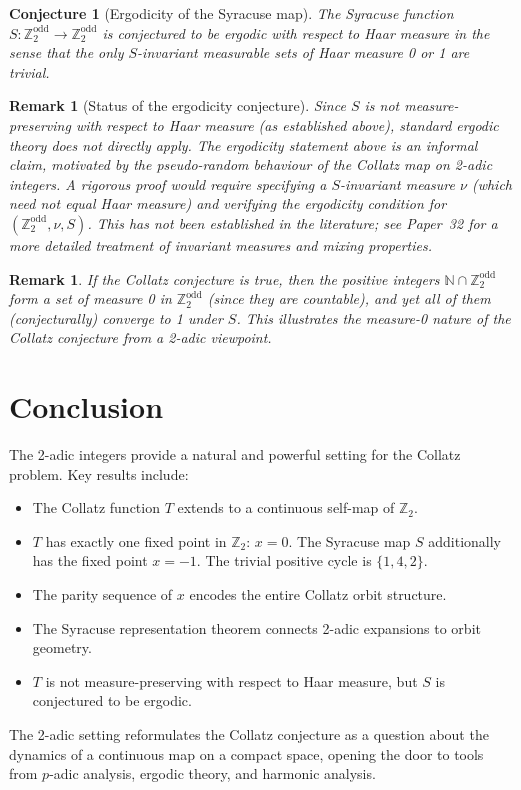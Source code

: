 \documentclass[12pt,a4paper]{article}
\newtheorem{remark}[theorem]{Remark}
\newtheorem{conjecture}[theorem]{Conjecture}
\begin{document}
\begin{conjecture}[Ergodicity of the Syracuse map]\label{conj:ergodic_S}
The Syracuse function $S\colon \mathbb{Z}_2^{\text{odd}} \to \mathbb{Z}_2^{\text{odd}}$
is conjectured to be \emph{ergodic with respect to Haar measure} in the sense that
the only $S$-invariant measurable sets of Haar measure 0 or 1 are trivial.
\end{conjecture}

\begin{remark}[Status of the ergodicity conjecture]
Since $S$ is \emph{not} measure-preserving with respect to Haar measure (as established
above), standard ergodic theory does not directly apply.  The ergodicity statement
above is an informal claim, motivated by the pseudo-random behaviour of the Collatz
map on 2-adic integers.  A rigorous proof would require specifying a $S$-invariant
measure $\nu$ (which need not equal Haar measure) and verifying the ergodicity
condition for $(\mathbb{Z}_2^{\text{odd}}, \nu, S)$.  This has not been established
in the literature; see Paper~32 for a more detailed treatment of invariant measures
and mixing properties.
\end{remark}

\begin{remark}\label{rem:conjecture_measure}
If the Collatz conjecture is true, then the positive integers $\mathbb{N} \cap \mathbb{Z}_2^{\text{odd}}$
form a set of measure 0 in $\mathbb{Z}_2^{\text{odd}}$ (since they are countable), and
yet \emph{all} of them (conjecturally) converge to 1 under $S$. This illustrates the
measure-0 nature of the Collatz conjecture from a 2-adic viewpoint.
\end{remark}

\section{Conclusion}

The 2-adic integers provide a natural and powerful setting for the Collatz problem.
Key results include:
\begin{itemize}
  \item The Collatz function $T$ extends to a continuous self-map of $\mathbb{Z}_2$.
  \item $T$ has exactly one fixed point in $\mathbb{Z}_2$: $x=0$. The Syracuse map $S$ additionally has the fixed point $x=-1$. The trivial positive cycle is $\{1, 4, 2\}$.
  \item The parity sequence of $x$ encodes the entire Collatz orbit structure.
  \item The Syracuse representation theorem connects 2-adic expansions to orbit geometry.
  \item $T$ is not measure-preserving with respect to Haar measure, but $S$ is conjectured to be ergodic.
\end{itemize}
The 2-adic setting reformulates the Collatz conjecture as a question about the dynamics
of a continuous map on a compact space, opening the door to tools from $p$-adic analysis,
ergodic theory, and harmonic analysis.
\end{document}
